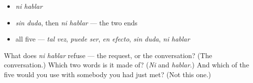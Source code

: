 \begin{itemize}
\raggedright
  \item \emph{ni hablar}
  \item \emph{sin duda}, then \emph{ni hablar} — the two ends
  \item all five — \emph{tal vez}, \emph{puede ser}, \emph{en efecto}, \emph{sin duda}, \emph{ni hablar}
\end{itemize}

\begin{tcolorbox}[breakable,colback=teal!4,colframe=teal!35!black,title={Before you move on}]
What does \emph{ni hablar} refuse — the request, or the conversation? (The conversation.) Which two words is it made of? (\emph{Ni} and \emph{hablar}.) And which of the five would you use with somebody you had just met? (Not this one.)
\end{tcolorbox}
